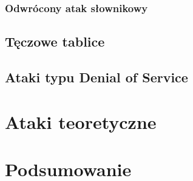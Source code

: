 \documentclass[12pt,a4paper,twoside]{article}
\begin{document}
\subsubsection{Odwrócony atak słownikowy}

\subsection{Tęczowe tablice}

\subsection{Ataki typu Denial of Service}

\section{Ataki teoretyczne}

\section{Podsumowanie}
\end{document}
